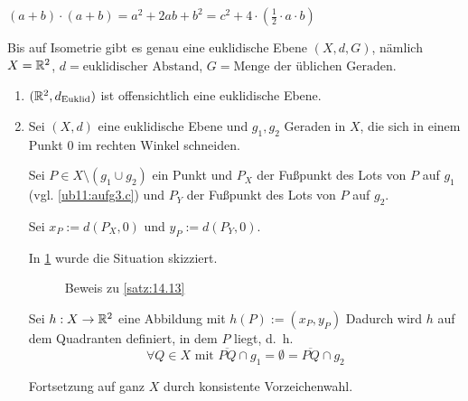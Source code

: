 \begin{beweis}
    $(a+b) \cdot (a+b) = a^2 + 2ab + b^2 = c^2 +4 \cdot (\frac{1}{2} \cdot a \cdot b)$
\end{beweis}

\begin{satz}\label{satz:14.13} %
    Bis auf Isometrie gibt es genau eine euklidische Ebene $(X, d, G)$, nämlich
    $X=\mathbb{R}^2$, $d = \text{euklidischer Abstand}$, $G = \text{Menge der üblichen Geraden}$.
\end{satz}
\goodbreak
\begin{beweis}\leavevmode
    \begin{enumerate}[label=(\roman*)]
        \item $(\mathbb{R}^2, d_\text{Euklid})$ ist offensichtlich eine euklidische Ebene.
        \item Sei $(X,d)$ eine euklidische Ebene und $g_1, g_2$ Geraden
              in $X$, die sich in einem Punkt $0$ im rechten Winkel
              schneiden. 

              Sei $P \in X \setminus (g_1 \cup g_2)$ ein Punkt und $P_X$ der 
              Fußpunkt des Lots von $P$ auf $g_1$ (vgl. \cref{ub11:aufg3.c}) 
              und $P_Y$ der Fußpunkt des Lots von $P$ auf $g_2$.

              Sei $x_P := d(P_X, 0)$ und $y_P := d(P_Y, 0)$.

              In \cref{fig:14.13.0.1} wurde die Situation skizziert.

            \begin{figure}[htp]
                \centering
                \subfloat[Schritt 1]{
                    \resizebox{0.45\linewidth}{!}{}
                    \label{fig:14.13.1}
                }%
                \subfloat[Schritt 2]{
                    \resizebox{0.45\linewidth}{!}{}
                    \label{fig:14.13.2}
                }%
                \caption{Beweis zu \cref{satz:14.13}}
                \label{fig:14.13.0.1}
            \end{figure}

            
              Sei $h:X \rightarrow \mathbb{R}^2$ eine Abbildung mit
              $h(P) := (x_P, y_P)$
              Dadurch wird $h$ auf dem Quadranten
              definiert, in dem $P$ liegt, d.~h. 
              \[\forall Q \in X \text{ mit } \overline{PQ} \cap g_1 = \emptyset = \overline{PQ} \cap g_2\]

              Fortsetzung auf ganz $X$ durch konsistente Vorzeichenwahl.


\end{enumerate}
\end{beweis}
